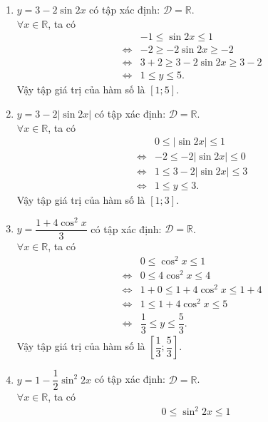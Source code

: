 \begin{bt}
{\begin{enumerate}
\begin{eqnarray*}
			&\Leftrightarrow& 2-3 \geq 2+3\cos x \geq 2+3\\
			&\Leftrightarrow& -1 \leq y \leq 5.
		\end{eqnarray*}
		Vậy tập giá trị của hàm số là $[-1;5]$.
		\item $y=3-2\sin 2x$ có tập xác định: $\mathscr{D}=\mathbb{R}$.\\
		$\forall x \in \mathbb{R}$, ta có
		\begin{eqnarray*}
			&&-1 \leq \sin 2x \leq 1\\
			&\Leftrightarrow& -2 \geq -2\sin 2x \geq -2\\
			&\Leftrightarrow& 3+2 \geq 3-2\sin 2x \geq 3-2\\
			&\Leftrightarrow& 1 \leq y \leq 5.
		\end{eqnarray*}
		Vậy tập giá trị của hàm số là $[1;5]$.
		\item $y=3-2|\sin 2x|$ có tập xác định: $\mathscr{D}=\mathbb{R}$.\\
		$\forall x \in \mathbb{R}$, ta có
		\begin{eqnarray*}
			&&0\leq	|\sin 2 x|\leq 1\\
			&\Leftrightarrow&  -2\leq	-2|\sin 2 x|\leq 0\\
			&\Leftrightarrow&  1\leq	3-2|\sin 2 x|\leq 3\\
			&\Leftrightarrow& 1\leq y\leq 3.
		\end{eqnarray*}
		Vậy tập giá trị của hàm số là $[1;3]$.
		\item $y=\dfrac{1+4\cos^{2}x}{3}$ có tập xác định: $\mathscr{D}=\mathbb{R}$.\\
		$\forall x \in \mathbb{R}$, ta có
		\begin{eqnarray*}
			&&0 \leq \cos ^{2} x \leq 1\\
			&\Leftrightarrow& 0 \leq 4\cos ^{2} x \leq 4\\
			&\Leftrightarrow& 1+0 \leq 1+4\cos ^{2} x \leq 1+4\\
			&\Leftrightarrow& 1 \leq 1+4\cos ^{2} x \leq 5\\
			&\Leftrightarrow& \dfrac{1}{3} \leq y \leq \dfrac{5}{3}.
		\end{eqnarray*}
		Vậy tập giá trị của hàm số là $\left[\dfrac{1}{3};\dfrac{5}{3}\right]$.
		\item $y=1-\dfrac{1}{2}\sin^{2}2x$ có tập xác định: $\mathscr{D}=\mathbb{R}$.\\
		$\forall x \in \mathbb{R}$, ta có
		\begin{eqnarray*}
			&&0 \leq \sin ^{2} 2x \leq 1\\

\end{eqnarray*}
\end{enumerate}}
\end{bt}
